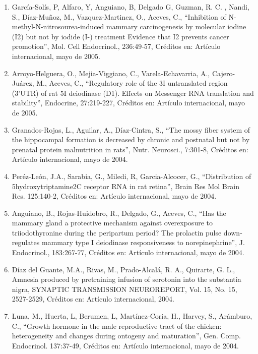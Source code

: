 \begin{enumerate}
\item García-Solís, P, Alfaro, Y, Anguiano, B, Delgado G, Guzman, R. C. , Nandi, S., Díaz-Muñoz, M., Vazquez-Martinez, O., 
Aceves, C., “Inhibition of N-methyl-N-nitrosourea-induced mammary carcinogenesis by molecular iodine (I2) but not by iodide 
(I-) treatment Evidence that I2 prevents cancer promotion”, Mol. Cell Endocrinol., 236:49-57, Créditos en: Artículo 
internacional, mayo de 2005.

\item Arroyo-Helguera, O., Mejia-Viggiano, C., Varela-Echavarria, A., Cajero-Juárez, M., Aceves, C., “Regulatory role of 
the 
3I untranslated region (3’UTR) of rat 5I deiodinase (D1). Effects on Messenger RNA translation and stability”, Endocrine, 
27:219-227, Créditos en: Artículo internacional, mayo de 2005.

\item Granados-Rojas, L., Aguilar, A., Díaz-Cintra, S., “The mossy fiber system of the hippocampal formation is decreased 
by 
chronic and postnatal but not by prenatal protein malnutrition in rats”, Nutr. Neurosci., 7:301-8, Créditos en: Artículo 
internacional, mayo de 2004.

\item Peréz-León, J.A., Sarabia, G., Miledi, R, Garcia-Alcocer, G., “Distribution of 5hydroxytriptamine2C receptor RNA in 
rat 
retina”, Brain Res Mol Brain Res. 125:140-2, Créditos en: Artículo internacional, mayo de 2004.

\item Anguiano, B., Rojas-Huidobro, R., Delgado, G., Aceves, C., “Has the mammary gland a protective mechanism against 
overexposure to triiodothyronine during the peripartum period? The prolactin pulse down-regulates mammary type I deiodinase 
responsiveness to norepinephrine”, J. Endocrinol., 183:267-77, Créditos en: Artículo internacional, mayo de 2004.

\item Díaz del Guante, M.A., Rivas, M., Prado-Alcalá, R. A., Quirarte, G. L., Amnesia produced by pretraining infusion of 
serotonin into the substantia nigra, SYNAPTIC TRANSMISSION NEUROREPORT, Vol. 15, No. 15, 2527-2529, Créditos en: Artículo 
internacional, 2004.

\item Luna, M., Huerta, L, Berumen, L, Martínez-Coria, H., Harvey, S., Arámburo, C., “Growth hormone in the male 
reproductive 
tract of the chicken: heterogeneity and changes during ontogeny and maturation”, Gen. Comp. Endocrinol. 137:37-49, Créditos 
en: Artículo internacional, mayo de 2004.


\end{enumerate}

